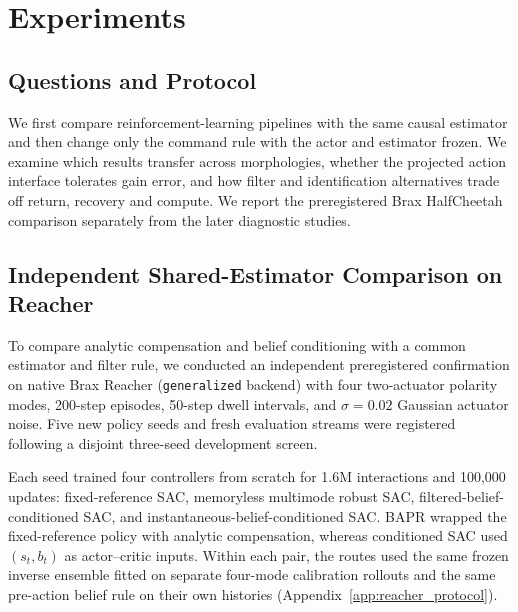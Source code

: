 \documentclass[twoside,11pt]{article}
\begin{document}
\section{Experiments}
\label{sec:experiments}

\subsection{Questions and Protocol}

We first compare reinforcement-learning pipelines with the same causal estimator and then change only the command rule with the actor and estimator frozen. We examine which results transfer across morphologies, whether the projected action interface tolerates gain error, and how filter and identification alternatives trade off return, recovery and compute. We report the preregistered Brax HalfCheetah comparison separately from the later diagnostic studies.

\subsection{Independent Shared-Estimator Comparison on Reacher}
\label{sec:reacher_confirmation}

To compare analytic compensation and belief conditioning with a common estimator and filter rule, we conducted an independent preregistered confirmation on native Brax Reacher (\texttt{generalized} backend) with four two-actuator polarity modes, 200-step episodes, 50-step dwell intervals, and $\sigma=0.02$ Gaussian actuator noise. Five new policy seeds and fresh evaluation streams were registered following a disjoint three-seed development screen.

Each seed trained four controllers from scratch for 1.6M interactions and 100,000 updates: fixed-reference SAC, memoryless multimode robust SAC, filtered-belief-conditioned SAC, and instantaneous-belief-conditioned SAC. BAPR wrapped the fixed-reference policy with analytic compensation, whereas conditioned SAC used $(s_t,b_t)$ as actor--critic inputs. Within each pair, the routes used the same frozen inverse ensemble fitted on separate four-mode calibration rollouts and the same pre-action belief rule on their own histories (Appendix~\ref{app:reacher_protocol}).
\end{document}
